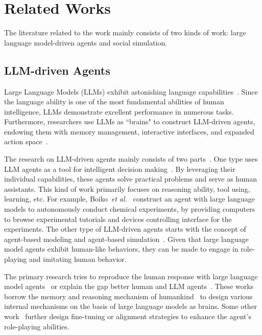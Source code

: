 \section{Related Works}
The literature related to the work mainly consists of two kinds of work: large language model-driven agents and social simulation.

\subsection{LLM-driven Agents}

Large Language Models (LLMs) exhibit astonishing language capabilities~\cite{wang2024survey}. Since the language ability is one of the most fundamental abilities of human intelligence, LLMs demonstrate excellent performance in numerous tasks. Furthermore, researchers use LLMs as ``brains" to construct LLM-driven agents, endowing them with memory management, interactive interfaces, and expanded action space~\cite{kwon2023efficient}.

The research on LLM-driven agents mainly consists of two parts~\cite{xi2023rise}. One type uses LLM agents as a tool for intelligent decision making~\cite{zhang2024large,ruan2023tptu,huang2023benchmarking}. By leveraging their individual capabilities, these agents solve practical problems and serve as human assistants. This kind of work primarily focuses on reasoning ability, tool using, learning, etc.
For example, Boiko~\textit{et al.}~\cite{boiko2023autonomous} construct an agent with large language models to autonomously conduct chemical experiments, by providing computers to browse experimental tutorials and devices controlling interface for the experiments.
The other type of LLM-driven agents starts with the concept of agent-based modeling and agent-based simulation~\cite{li2024econagent,gao2023s,gao2024large}. Given that large language model agents exhibit human-like behaviors, they can be made to engage in role-playing and imitating human behavior. 

The primary research tries to reproduce the human response with large language model agents~\cite{park2023generative,zhang2024generative,gao2023s} or explain the gap better human and LLM agents~\cite{huang2024social}.
These works borrow the memory and reasoning mechanism of humankind~\cite{guo2023empowering,zhang2024survey} to design various internal mechanisms on the basis of large language models as brains.
Some other work~\cite{pang2024self,liu2023training} further design fine-tuning or alignment strategies to enhance the agent's role-playing abilities.

